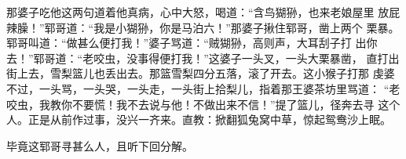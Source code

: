 那婆子吃他这两句道着他真病，心中大怒，喝道：“含鸟猢狲，也来老娘屋里
放屁辣臊！”郓哥道：“我是小猢狲，你是马泊六！”那婆子揪住郓哥，凿上两个
栗暴。郓哥叫道：“做甚么便打我！”婆子骂道：“贼猢狲，高则声，大耳刮子打
出你去！”郓哥道：“老咬虫，没事得便打我！”这婆子一头叉，一头大栗暴凿，
直打出街上去，雪梨篮儿也丢出去。那篮雪梨四分五落，滚了开去。这小猴子打那
虔婆不过，一头骂，一头哭，一头走，一头街上拾梨儿，指着那王婆茶坊里骂道：
“老咬虫，我教你不要慌！我不去说与他！不做出来不信！”提了篮儿，径奔去寻
这个人。正是从前作过事，没兴一齐来。直教：掀翻狐兔窝中草，惊起鸳鸯沙上眠。

毕竟这郓哥寻甚么人，且听下回分解。